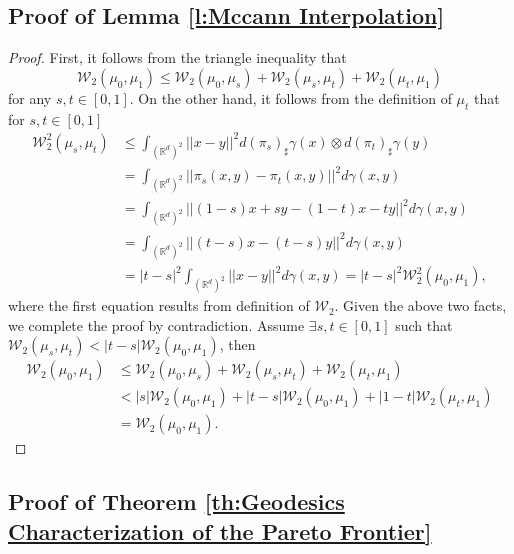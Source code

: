 \documentclass[twoside,11pt]{article}
\begin{document}
\subsection{Proof of Lemma \ref{l:Mccann Interpolation}}

\begin{proof}
First, it follows from the triangle inequality that $$\mathcal{W}_2(\mu_0,\mu_1) \leq \mathcal{W}_2(\mu_0,\mu_s) + \mathcal{W}_2(\mu_s,\mu_t) + \mathcal{W}_2(\mu_t,\mu_1)$$ for any $s,t \in [0,1]$. 
On the other hand, it follows from the definition of $\mu_t$ that for $s,t \in [0,1]$
\begin{align*}
\mathcal{W}_2^2(\mu_s,\mu_t) & \leq \int_{(\mathbb{R}^d)^2} ||x-y||^2 d(\pi_s)_{\sharp}\gamma(x) \otimes d(\pi_t)_{\sharp}\gamma(y)\\
& =  \int_{(\mathbb{R}^d)^2} ||\pi_s(x,y)-\pi_t(x,y)||^2 d\gamma(x,y) \\
& =  \int_{(\mathbb{R}^d)^2} ||(1-s)x + sy - (1-t)x - ty||^2 d\gamma(x,y)\\
& = \int_{(\mathbb{R}^d)^2} ||(t-s)x - (t-s)y||^2 d\gamma(x,y)\\
& = |t-s|^2\int_{(\mathbb{R}^d)^2} ||x - y||^2 d\gamma(x,y) = |t-s|^2\mathcal{W}_2^2(\mu_0,\mu_1),
\end{align*}
where the first equation results from definition of $\mathcal{W}_2$. 
Given the above two facts,  we complete the proof by contradiction. Assume $\exists s,t \in [0,1]$ such that $\mathcal{W}_2(\mu_s,\mu_t) < |t-s|\mathcal{W}_2(\mu_0,\mu_1)$, then 
\begin{align*}
\mathcal{W}_2(\mu_0,\mu_1) & \leq \mathcal{W}_2(\mu_0,\mu_s) + \mathcal{W}_2(\mu_s,\mu_t) + \mathcal{W}_2(\mu_t,\mu_1)\\
& < |s|\mathcal{W}_2(\mu_0,\mu_1) + |t-s|\mathcal{W}_2(\mu_0,\mu_1) + |1-t|\mathcal{W}_2(\mu_t,\mu_1)\\
& = \mathcal{W}_2(\mu_0,\mu_1).
\end{align*}
\end{proof}

\subsection{Proof of Theorem \ref{th:Geodesics Characterization of the Pareto Frontier}}
\end{document}

